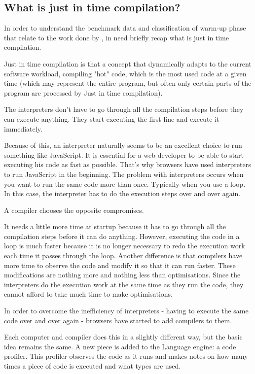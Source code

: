 \documentclass{article}
\begin{document}
\subsection{What is just in time compilation? }


In order to understand the benchmark data and classification of warm-up phase that relate to the work done by \citep{barrett2017virtual}, in need briefly recap what is just in time compilation.

Just in time compilation \citep{aycock2003brief} is that a concept that dynamically adapts to the current software workload, compiling "hot" code, which is the most used code at a given time (which may represent the entire program, but often only certain parts of the program are processed by Just in time compilation).

The interpreters don't have to go through all the compilation steps before they can execute anything. They start executing the first line and execute it immediately.

Because of this, an interpreter naturally seems to be an excellent choice to run something like JavaScript. It is essential for a web developer to be able to start executing his code as fast as possible. That's why browsers have used interpreters to run JavaScript in the beginning.
The problem with interpreters occurs when you want to run the same code more than once. Typically when you use a loop. In this case, the interpreter has to do the execution steps over and over again.

A compiler chooses the opposite compromises.

It needs a little more time at startup because it has to go through all the compilation steps before it can do anything. However, executing the code in a loop is much faster because it is no longer necessary to redo the execution work each time it passes through the loop.
Another difference is that compilers have more time to observe the code and modify it so that it can run faster. These modifications are nothing more and nothing less than optimisations. Since the interpreters do the execution work at the same time as they run the code, they cannot afford to take much time to make optimisations.

In order to overcome the inefficiency of interpreters - having to execute the same code over and over again - browsers have started to add compilers to them.

Each computer and compiler does this in a slightly different way, but the basic idea remains the same. A new piece is added to the Language engine: a code profiler. This profiler observes the code as it runs and makes notes on how many times a piece of code is executed and what types are used.
\end{document}
